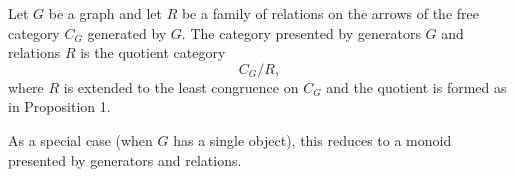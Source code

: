 Let $G$ be a graph and let $R$ be a family of relations on the arrows of the free category $C_G$ generated by $G$. The category presented by generators $G$ and relations $R$ is the quotient category
$$C_G / R,$$
where $R$ is extended to the least congruence on $C_G$ and the quotient is formed as in Proposition 1.

As a special case (when $G$ has a single object), this reduces to a monoid presented by generators and relations.
